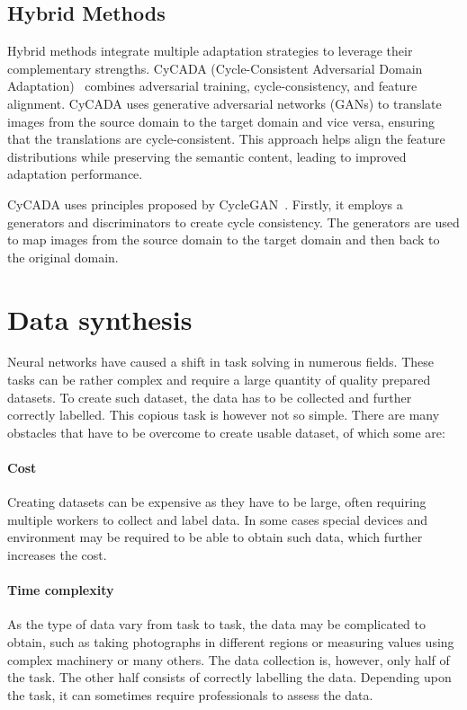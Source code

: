 \subsection{Hybrid Methods}
Hybrid methods integrate multiple adaptation strategies to leverage their complementary strengths. CyCADA (Cycle-Consistent Adversarial Domain Adaptation)~\cite{hybridMethod} combines adversarial training, cycle-consistency, and feature alignment. CyCADA uses generative adversarial networks (GANs) to translate images from the source domain to the target domain and vice versa, ensuring that the translations are cycle-consistent. This approach helps align the feature distributions while preserving the semantic content, leading to improved adaptation performance.

CyCADA uses principles proposed by CycleGAN~\cite{CycleGAN}. Firstly, it employs a generators and discriminators to create cycle consistency. The generators are used to map images from the source domain to the target domain and then back to the original domain.










\section{Data synthesis}
Neural networks have caused a shift in task solving in numerous fields. These tasks can be rather complex and require a large quantity of quality prepared datasets. To create such dataset, the data has to be collected and further correctly labelled. This copious task is however not so simple. There are many obstacles that have to be overcome to create usable dataset, of which some are:

\paragraph{Cost} Creating datasets can be expensive as they have to be large, often requiring multiple workers to collect and label data. In some cases special devices and environment may be required to be able to obtain such data, which further increases the cost.
\paragraph{Time complexity} As the type of data vary from task to task, the data may be complicated to obtain, such as taking photographs in different regions or measuring values using complex machinery or many others. The data collection is, however, only half of the task. The other half consists of correctly labelling the data. Depending upon the task, it can sometimes require professionals to assess the data.
